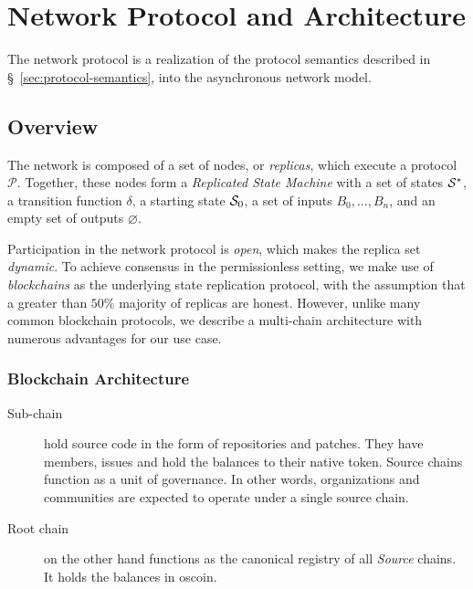 \section{Network Protocol and Architecture}

The \oscoin{} network protocol is a realization of the protocol semantics
described in \S~\ref{sec:protocol-semantics}, into the asynchronous network
model.

\subsection{Overview}


The \oscoin{} network is composed of a set of nodes, or \emph{replicas}, which
execute a protocol $\mathcal{P}$. Together, these nodes form a \emph{Replicated
State Machine} with a set of states $\mathcal{S}^*$, a transition function $\delta$,
a starting state $\mathcal{S}_0$, a set of inputs $B_0,\dots,B_n$, and an empty set
of outputs $\varnothing$.

Participation in the network protocol is \emph{open}, which makes the replica
set \emph{dynamic}. To achieve consensus in the permissionless setting, we make
use of \emph{blockchains} as the underlying state replication protocol, with
the assumption that a greater than $50\%$ majority of replicas are honest.
However, unlike many common blockchain protocols, we describe a multi-chain
architecture with numerous advantages for our use case.

\subsubsection{Blockchain Architecture}


\begin{description}
    \item[Sub-chain] hold source code in the form of repositories and
        patches.  They have members, issues and hold the balances to their
        native token.  Source chains function as a unit of governance.  In
        other words, organizations and communities are expected to operate
        under a single source chain.
    \item[Root chain] on the other hand functions as the canonical registry
        of all \emph{Source} chains. It holds the balances in oscoin.
\end{description}


